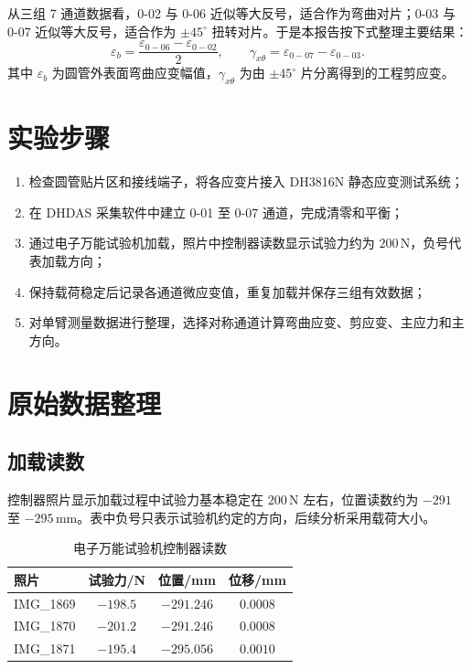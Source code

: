 \documentclass[UTF8,a4paper,10pt]{ctexart}
\begin{document}
从三组 7 通道数据看，0-02 与 0-06 近似等大反号，适合作为弯曲对片；0-03 与 0-07 近似等大反号，适合作为 $\pm45^\circ$ 扭转对片。于是本报告按下式整理主要结果：
\begin{equation}
    \varepsilon_b=\frac{\varepsilon_{0-06}-\varepsilon_{0-02}}{2},
    \qquad
    \gamma_{x\theta}=\varepsilon_{0-07}-\varepsilon_{0-03}.
\end{equation}
其中 $\varepsilon_b$ 为圆管外表面弯曲应变幅值，$\gamma_{x\theta}$ 为由 $\pm45^\circ$ 片分离得到的工程剪应变。

\section{实验步骤}

\begin{enumerate}
    \item 检查圆管贴片区和接线端子，将各应变片接入 DH3816N 静态应变测试系统；
    \item 在 DHDAS 采集软件中建立 0-01 至 0-07 通道，完成清零和平衡；
    \item 通过电子万能试验机加载，照片中控制器读数显示试验力约为 $200\,\mathrm{N}$，负号代表加载方向；
    \item 保持载荷稳定后记录各通道微应变值，重复加载并保存三组有效数据；
    \item 对单臂测量数据进行整理，选择对称通道计算弯曲应变、剪应变、主应力和主方向。
\end{enumerate}

\section{原始数据整理}

\subsection{加载读数}

控制器照片显示加载过程中试验力基本稳定在 $200\,\mathrm{N}$ 左右，位置读数约为 $-291$ 至 $-295\,\mathrm{mm}$。表中负号只表示试验机约定的方向，后续分析采用载荷大小。

\begin{table}[H]
    \centering
    \caption{电子万能试验机控制器读数}
    \begin{tabular}{lccc}
        \toprule
        照片 & 试验力/N & 位置/mm & 位移/mm \\
        \midrule
        IMG\_1869 & $-198.5$ & $-291.246$ & $0.0008$ \\
        IMG\_1870 & $-201.2$ & $-291.246$ & $0.0008$ \\
        IMG\_1871 & $-195.4$ & $-295.056$ & $0.0010$ \\
        \bottomrule
    \end{tabular}
\end{table}
\end{document}
